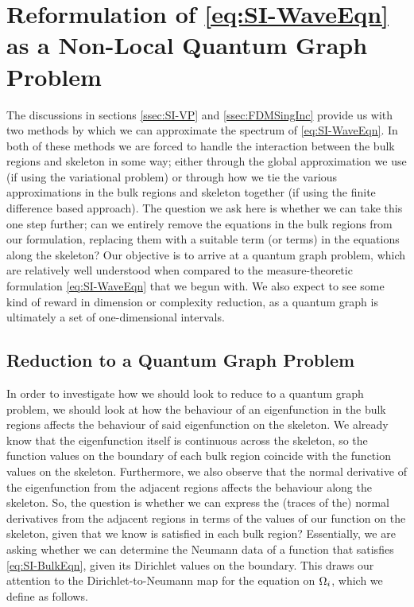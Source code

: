 \section{Reformulation of \eqref{eq:SI-WaveEqn} as a Non-Local Quantum Graph Problem} \label{sec:SI-NonLocalQG}


The discussions in sections \ref{ssec:SI-VP} and \ref{ssec:FDMSingInc} provide us with two methods by which we can approximate the spectrum of \eqref{eq:SI-WaveEqn}.
In both of these methods we are forced to handle the interaction between the bulk regions and skeleton in some way; either through the global approximation we use (if using the variational problem) or through how we tie the various approximations in the bulk regions and skeleton together (if using the finite difference based approach).
The question we ask here is whether we can take this one step further; can we entirely remove the equations in the bulk regions from our formulation, replacing them with a suitable term (or terms) in the equations along the skeleton?
Our objective is to arrive at a quantum graph problem, which are relatively well understood when compared to the measure-theoretic formulation \eqref{eq:SI-WaveEqn} that we begun with.
We also expect to see some kind of reward in dimension or complexity reduction, as a quantum graph is ultimately a set of one-dimensional intervals.

\subsection{Reduction to a Quantum Graph Problem} \label{ssec:SI-ToQG}
In order to investigate how we should look to reduce  to a quantum graph problem, we should look at how the behaviour of an eigenfunction in the bulk regions affects the behaviour of said eigenfunction on the skeleton.
We already know that the eigenfunction itself is continuous across the skeleton, so the function values on the boundary of each bulk region coincide with the function values on the skeleton.
Furthermore, we also observe that the normal derivative of the eigenfunction from the adjacent regions affects the behaviour along the skeleton.
So, the question is whether we can express the (traces of the) normal derivatives from the adjacent regions in terms of the values of our function on the skeleton, given that we know  is satisfied in each bulk region?
Essentially, we are asking whether we can determine the Neumann data of a function that satisfies \eqref{eq:SI-BulkEqn}, given its Dirichlet values on the boundary.
This draws our attention to the Dirichlet-to-Neumann map for the  equation on $\Omega_i$, which we define as follows.

